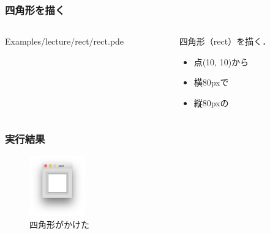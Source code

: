 \documentclass[10pt, dvipdfmx]{beamer}
\begin{document}
        \begin{frame}
            \frametitle{四角形を描く}
            \begin{columns}[c]
                \begin{column}{0.50\textwidth}
                    \tiny
                    Examples/lecture/rect/rect.pde
                    \scriptsize
                \end{column}
                \begin{column}{0.50\textwidth}
                    \begin{block}{四角形（rect）を描く．}
                        \begin{itemize}
                            \item 点(10, 10)から
                            \item 横80pxで
                            \item 縦80pxの
                        \end{itemize}
                    \end{block}
                \end{column}
            \end{columns}
        \end{frame}

        \begin{frame}
            \frametitle{実行結果}
                \begin{figure}[htb]
                    \includegraphics[width=24mm]{images/06.png}
                    \caption{四角形がかけた}
                    \label{fig:06}
                \end{figure}
        \end{frame}
\end{document}
